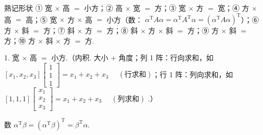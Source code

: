 



\begin{fkey}{熟记形状}
① 宽 $\times$ 高 $=$ 小方；② 高 $\times$ 宽 $=$ 方；③ 宽 $\times$ 方 $=$ 宽；④ 方 $\times$ 高 $=$ 高；⑤ 宽 $\times$ 方 $\times$ 高 $=$ 小方（数： $\alpha^{\mathrm T}A\alpha=\alpha^{\mathrm T}A^{\mathrm T}\alpha=(\alpha^{\mathrm T}A\alpha)^{\mathrm T}$）；⑥ 方 $\times$ 斜 $=$ 方；⑦ 斜 $\times$ 方 $=$ 方；⑧ 斜 $\times$ 方 $\times$ 斜 $=$ 方；⑨ 方 $\times$ 斜 $=$ 方；⑩ 方 $\times$ 斜 $\times$ 方 $=$ 方.
\end{fkey}




1. 宽 $\times$ 高 $=$ 小方.（内积. 大小 $+$ 角度；列 1 阵：行向求和，如 $[x_1,x_2,x_3]\begin{bmatrix}1\\1\\1\end{bmatrix}=x_1+x_2+x_3$ $\quad(\text{行求和})$；行 1 阵：列向求和，如 $[1,1,1]\begin{bmatrix}x_1\\x_2\\x_3\end{bmatrix}=x_1+x_2+x_3$ $\quad(\text{列求和})$ .）

数 $\alpha^{\mathrm T}\beta=(\alpha^{\mathrm T}\beta)^{\mathrm T}=\beta^{\mathrm T}\alpha$.

